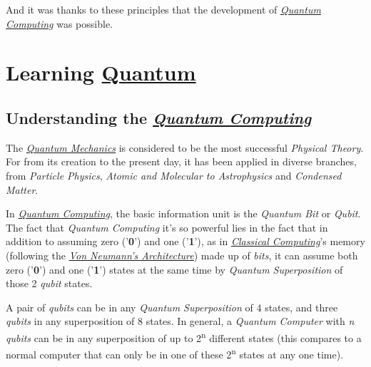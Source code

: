 \documentclass[conference]{IEEEtran}
\begin{document}
\vspace{6pt}

And it was thanks to these principles that the development of \href{https://en.wikipedia.org/wiki/Quantum_computing}{\textit{Quantum Computing}} was possible.

\vspace{6pt}

\section{Learning \href{https://en.wikipedia.org/wiki/Quantum}{Quantum}}

\subsection{Understanding the \href{https://en.wikipedia.org/wiki/Quantum_computing}{\textit{Quantum Computing}}}\label{AA}

The \href{https://en.wikipedia.org/wiki/Quantum_mechanics}{\textit{Quantum Mechanics}} is considered to be the most successful \textit{Physical Theory}. For from its creation to the present day, it has been applied in diverse branches, from \textit{Particle Physics}, \textit{Atomic and Molecular to Astrophysics} and \textit{Condensed Matter}.

\vspace{4pt}

In \href{https://en.wikipedia.org/wiki/Quantum_computing}{\textit{Quantum Computing}}, the basic information unit is the \textit{Quantum Bit} or \textit{Qubit}. The fact that \textit{Quantum Computing} it's so powerful lies in the fact that in addition to assuming zero ('\textbf{0}') and one ('\textbf{1}'), as in \href{https://en.wikipedia.org/wiki/Von_Neumann_architecture}{\textit{Classical Computing}}'s memory (following the \href{https://en.wikipedia.org/wiki/Von_Neumann_architecture}{\textit{Von Neumann's Architecture}}) made up of \textit{bits}, it can assume both zero ('\textbf{0}') and one ('\textbf{1}') states at the same time by \textit{Quantum Superposition} of those 2 \textit{qubit} states.

\newpage

A pair of \textit{qubits} can be in any \textit{Quantum Superposition} of 4 states, and three \textit{qubits} in any superposition of 8 states. In general, a \textit{Quantum Computer} with \textit{n qubits} can be in any superposition of up to 2\textsuperscript{n} different states (this compares to a normal computer that can only be in one of these 2\textsuperscript{n} states at any one time).
\end{document}
